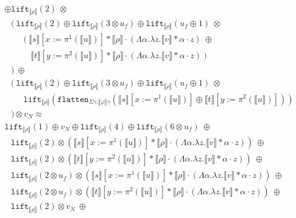 \documentclass[a4paper,UKenglish,cleveref,autoref,numberwithinsect]{lipics-v2019}
\theoremstyle{definition}
\newcommand{\abs}[2]{\lambda #1.#2}
\newcommand{\tabs}[2]{\Lambda #1.#2}
\newcommand{\flatten}{\mathtt{flatten}}
\newcommand{\lift}{\mathtt{lift}}
\newcommand{\typeinterpret}[1]{\llbracket #1 \rrbracket}
\newcommand{\interpret}[1]{\llbracket #1 \rrbracket}
\begin{document}
\begin{itemize}
\[\begin{array}{l}
    \oplus \lift_{\interpret{\rho}}(2)\ \otimes \\
  \phantom{A}
  (\ \lift_{\typeinterpret{\rho}}(2) \oplus
    \lift_{\typeinterpret{\rho}}(3 \otimes u_f) \oplus
     \lift_{\typeinterpret{\rho}}(u_f \oplus 1)\ \otimes \\
  \phantom{ABC}(\ \interpret{s}[x:=\pi^1(\interpret{u})] *
    \typeinterpret{\rho} \cdot
    (\tabs{\alpha}{\abs{z}{\interpret{v} * \alpha \cdot z}})\ \oplus \\
  \phantom{ABCD} \interpret{t}[y:=\pi^2(\interpret{u})] *
    \typeinterpret{\rho} \cdot
    (\tabs{\alpha}{\abs{z}{\interpret{v} * \alpha \cdot z}})\ ) \\
  \phantom{A})\ \oplus \\
  \phantom{A}(\ 
  \lift_{\typeinterpret{\rho}}(2) \oplus
    \lift_{\typeinterpret{\rho}}(3 \otimes u_f) \oplus
  \lift_{\typeinterpret{\rho}}(u_f \oplus 1)\ \otimes \\
  \phantom{ABC}
    \lift_{\typeinterpret{\rho}}(\flatten_{\Sigma\gamma.\typeinterpret{
    \varphi}\gamma}(\interpret{s}[x:=\pi^1(\interpret{u})] \oplus
      \interpret{t}[y:=\pi^2(\interpret{u})])) \\
  \phantom{A}) \otimes v_N \approx \\
  \lift_{\interpret{\rho}}(1) \oplus v_N \oplus
    \lift_{\interpret{\rho}}(4) \oplus
    \lift_{\typeinterpret{\rho}}(6 \otimes u_f)\ \oplus \\
  \phantom{A}
  \lift_{\interpret{\rho}}(2) \otimes
      (\interpret{s}[x:=\pi^1(\interpret{u})] * \typeinterpret{\rho} \cdot
      (\tabs{\alpha}{\abs{z}{\interpret{v} * \alpha \cdot z}}))\ \oplus \\
  \phantom{A}
  \lift_{\interpret{\rho}}(2) \otimes
      (\interpret{t}[y:=\pi^2(\interpret{u})] * \typeinterpret{\rho} \cdot
      (\tabs{\alpha}{\abs{z}{\interpret{v} * \alpha \cdot z}}))\ \oplus \\
  \phantom{A}
  \lift_{\interpret{\rho}}(2 \otimes u_f) \otimes
    (\interpret{s}[x:=\pi^1(\interpret{u})] *
    \typeinterpret{\rho} \cdot
    (\tabs{\alpha}{\abs{z}{\interpret{v} * \alpha \cdot z}}))\ \oplus \\
  \phantom{A}
  \lift_{\interpret{\rho}}(2 \otimes u_f) \otimes
    (\interpret{t}[y:=\pi^2(\interpret{u})] *
    \typeinterpret{\rho} \cdot
    (\tabs{\alpha}{\abs{z}{\interpret{v} * \alpha \cdot z}}))\ \oplus \\
  \phantom{A}
  \lift_{\typeinterpret{\rho}}(2) \otimes v_N\ \oplus \\
  \phantom{A}

\end{array}\]
\end{itemize}
\end{document}
